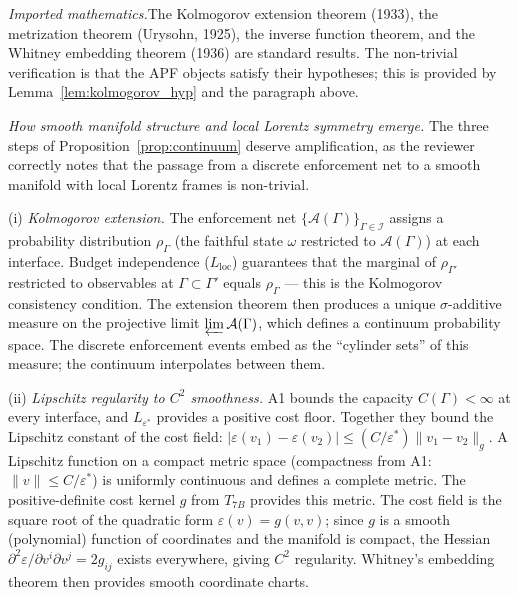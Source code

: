 \documentclass[11pt,a4paper]{article}
\theoremstyle{definition}
\begin{document}
\smallskip\noindent\textit{Imported mathematics.}\quad The Kolmogorov
extension theorem (1933), the metrization theorem (Urysohn, 1925),
the inverse function theorem, and the Whitney embedding theorem (1936)
are standard results.  The non-trivial verification is that the APF
objects satisfy their hypotheses; this is provided by
Lemma~\ref{lem:kolmogorov_hyp} and the paragraph above.

\smallskip\noindent\textit{How smooth manifold structure and local
Lorentz symmetry emerge.}\quad
The three steps of Proposition~\ref{prop:continuum} deserve
amplification, as the reviewer correctly notes that the passage from
a discrete enforcement net to a smooth manifold with local Lorentz
frames is non-trivial.

\smallskip\noindent(i) \textit{Kolmogorov extension.}\quad
The enforcement net $\{\mathcal{A}(\Gamma)\}_{\Gamma \in \mathcal{I}}$
assigns a probability distribution $\rho_\Gamma$ (the faithful state
$\omega$ restricted to $\mathcal{A}(\Gamma)$) at each interface.
Budget independence ($L_{\mathrm{loc}}$) guarantees that the marginal
of $\rho_{\Gamma'}$ restricted to observables at $\Gamma \subset
\Gamma'$ equals $\rho_\Gamma$ --- this is the Kolmogorov consistency
condition.  The extension theorem then produces a unique
$\sigma$-additive measure on the projective limit
$\varprojlim \mathcal{A}(\Gamma)$, which defines a continuum
probability space.  The discrete enforcement events embed as the
``cylinder sets'' of this measure; the continuum interpolates between
them.

\smallskip\noindent(ii) \textit{Lipschitz regularity to $C^2$
smoothness.}\quad
A1 bounds the capacity $C(\Gamma) < \infty$ at every interface, and
$L_{\varepsilon^*}$ provides a positive cost floor.  Together they
bound the Lipschitz constant of the cost field:
$|\varepsilon(v_1) - \varepsilon(v_2)| \le (C / \varepsilon^*)
\|v_1 - v_2\|_g$.  A Lipschitz function on a compact metric space
(compactness from A1: $\|v\| \le C / \varepsilon^*$) is uniformly
continuous and defines a complete metric.  The positive-definite cost
kernel $g$ from $T_{7B}$ provides this metric.  The cost field is the
square root of the quadratic form $\varepsilon(v) = g(v,v)$; since $g$
is a smooth (polynomial) function of coordinates and the manifold
is compact, the Hessian $\partial^2 \varepsilon / \partial v^i
\partial v^j = 2g_{ij}$ exists everywhere, giving $C^2$ regularity.
Whitney's embedding theorem then provides smooth coordinate charts.
\end{document}
